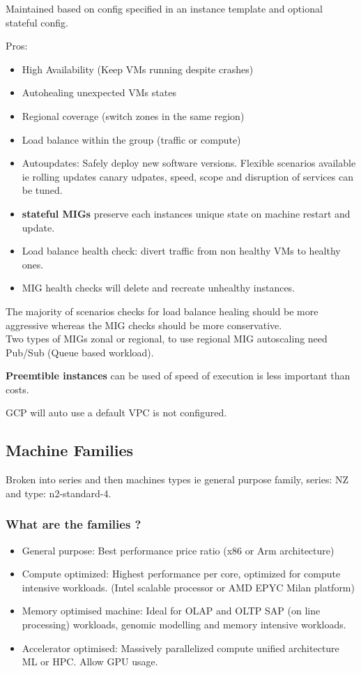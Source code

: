 \documentclass[11pt]{scrartcl} %
\begin{document}
Maintained based on config specified in an instance template and optional stateful config.

Pros:
\begin{itemize}
	\item High Availability (Keep VMs running despite crashes)
	\item Autohealing unexpected VMs states
	\item Regional coverage (switch zones in the same region)
	\item Load balance within the group (traffic or compute)
	\item Autoupdates: Safely deploy new software versions. Flexible scenarios available ie rolling updates
	canary udpates, speed, scope and disruption of services can be tuned.
	\item \textbf{stateful MIGs} preserve each instances unique state on machine restart and update.
	\item Load balance health check: divert traffic from non healthy VMs to healthy ones.
	\item MIG health checks will delete and recreate unhealthy instances.
\end{itemize}

The majority of scenarios checks for load balance healing should be more aggressive whereas the MIG
checks should be more conservative. \\

Two types of MIGs zonal or regional, to use regional MIG autoscaling need Pub/Sub (Queue based workload).

\textbf{Preemtible instances} can be used of speed of execution is less important than costs.

GCP will auto use a default VPC is not configured.

\subsection{Machine Families}

Broken into series and then machines types ie general purpose family, series: NZ and type: n2-standard-4.

\subsubsection{What are the families ?}

\begin{itemize}
	\item General purpose: Best performance price ratio (x86 or Arm architecture)
	\item Compute optimized: Highest performance per core, optimized for compute intensive workloads.
	(Intel scalable processor or AMD EPYC Milan platform)
	\item Memory optimised machine: Ideal for OLAP and OLTP SAP (on line processing) workloads, genomic modelling
	and memory intensive workloads.
	\item Accelerator optimised: Massively parallelized compute unified architecture ML or HPC. Allow GPU usage.
\end{itemize}
\end{document}
